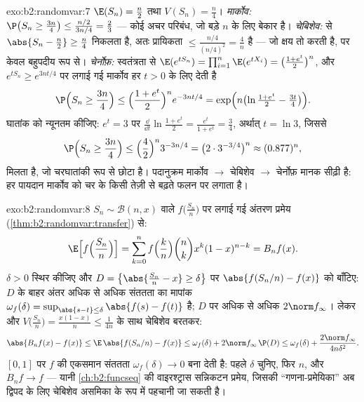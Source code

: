 \begin{solution}{exo:b2:randomvar:7}
$\E(S_n) = \frac n2$ तथा $V(S_n) = \frac n4$।
\emph{मार्कोव:} $\P\bigl(S_n \geq \frac{3n}4\bigr) \leq
\frac{n/2}{3n/4} = \frac23$ --- कोई अचर परिबंध, जो बड़े $n$ के लिए बेकार है।
\emph{चेबिशेव:}  से $\abs{S_n - \frac n2} \geq
\frac n4$ निकलता है, अतः प्रायिकता $\leq \frac{n/4}{(n/4)^2} =
\frac4n$ है ---
जो क्षय तो करती है, पर केवल बहुपदीय रूप से।
\emph{चेर्नोफ़:} स्वतंत्रता से $\E(e^{tS_n}) =
\prod_{i=1}^n\E(e^{tX_i}) = \bigl(\frac{1 + e^t}{2}\bigr)^n$, और $e^{tS_n} \geq e^{3nt/4}$ पर लगाई गई मार्कोव हर
$t >
0$ के लिए देती है
\[
\P\Bigl(S_n \geq \frac{3n}4\Bigr)
\leq \Bigl(\frac{1 + e^t}{2}\Bigr)^n e^{-3nt/4}
= \exp\Bigl(n\bigl(\ln\tfrac{1 + e^t}{2} - \tfrac{3t}4\bigr)\Bigr).
\]
घातांक को न्यूनतम कीजिए: $e^t = 3$ पर $\frac{\dd}{\dd t}\ln\frac{1+e^t}{2} =
\frac{e^t}{1 + e^t} = \frac34$, अर्थात् $t = \ln 3$, जिससे
\[
\P\Bigl(S_n \geq \frac{3n}4\Bigr)
\leq \Bigl(\frac{4}{2}\Bigr)^n 3^{-3n/4}
= \bigl(2 \cdot 3^{-3/4}\bigr)^n \approx (0.877)^n ,
\]
मिलता है, जो चरघातांकी रूप से छोटा है। पदानुक्रम मार्कोव $\to$
चेबिशेव $\to$ चेर्नोफ़ मानक सीढ़ी है: हर पायदान मार्कोव को चर के
किसी तेज़ी से बढ़ते फलन पर लगाता है।
\end{solution}

\begin{solution}{exo:b2:randomvar:8}
$S_n \sim
\mathcal{B}(n, x)$ वाले $f\bigl(\frac{S_n}{n}\bigr)$ पर लगाई गई अंतरण प्रमेय (\cref{thm:b2:randomvar:transfer}) से:
\[
\E\Bigl[f\Bigl(\frac{S_n}{n}\Bigr)\Bigr]
= \sum_{k=0}^n f\Bigl(\frac kn\Bigr)\binom nk x^k(1-x)^{n-k}
= B_nf(x) .
\]
$\delta > 0$ स्थिर कीजिए और  $D
= \bigl\{\abs{\frac{S_n}{n} - x} \geq \delta\bigr\}$ पर $\abs{f(S_n/n) - f(x)}$ को बाँटिए: $D$ के बाहर अंतर
अधिक से अधिक संततता का मापांक $\omega_f(\delta) = \sup_{\abs{s - t}\leq\delta}\abs{f(s) -
f(t)}$ है; $D$ पर अधिक से अधिक $2\norm f_\infty$।
 लेकर और $V\bigl(\frac{S_n}{n}\bigr) =
\frac{x(1-x)}{n} \leq \frac{1}{4n}$ के साथ चेबिशेव बरतकर:
\[
\abs{B_nf(x) - f(x)}
\leq \E\,\abs{f(S_n/n) - f(x)}
\leq \omega_f(\delta)
+ 2\norm f_\infty\,\P(D)
\leq \omega_f(\delta) + \frac{2\norm f_\infty}{4n\delta^2} .
\]
$[0, 1]$ पर $f$ की एकसमान संततता $\omega_f(\delta) \to
0$ बना देती है: पहले $\delta$ चुनिए,
फिर $n$, और  $B_nf \to f$ --- यानी \cref{ch:b2:funcseq} की वाइरश्ट्रास
सन्निकटन प्रमेय, जिसकी ``गणना-प्रमेयिका'' अब द्विपद  के लिए
चेबिशेव असमिका के रूप में पहचानी जा सकती है।
\end{solution}

